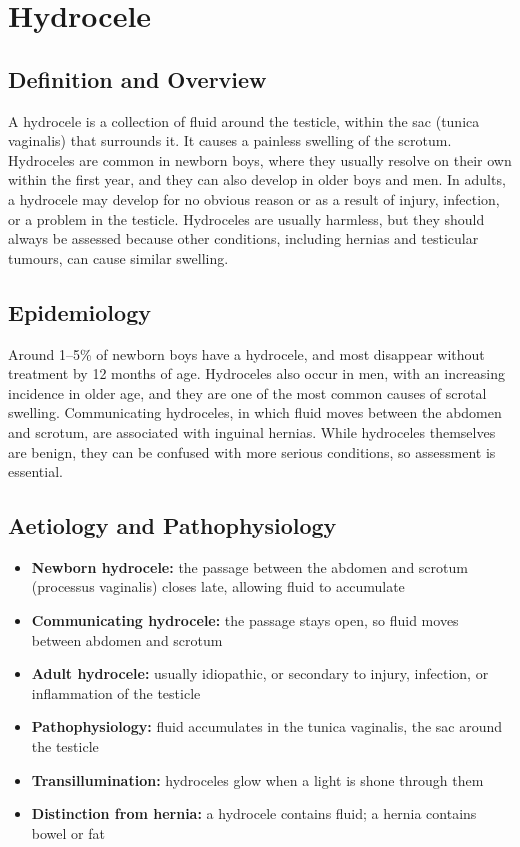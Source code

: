 \chapter{Hydrocele}

\section*{Definition and Overview}
A hydrocele is a collection of fluid around the testicle, within the sac (tunica vaginalis) that surrounds it. It causes a painless swelling of the scrotum. Hydroceles are common in newborn boys, where they usually resolve on their own within the first year, and they can also develop in older boys and men. In adults, a hydrocele may develop for no obvious reason or as a result of injury, infection, or a problem in the testicle. Hydroceles are usually harmless, but they should always be assessed because other conditions, including hernias and testicular tumours, can cause similar swelling.

\section*{Epidemiology}
Around 1--5\% of newborn boys have a hydrocele, and most disappear without treatment by 12 months of age. Hydroceles also occur in men, with an increasing incidence in older age, and they are one of the most common causes of scrotal swelling. Communicating hydroceles, in which fluid moves between the abdomen and scrotum, are associated with inguinal hernias. While hydroceles themselves are benign, they can be confused with more serious conditions, so assessment is essential.

\section*{Aetiology and Pathophysiology}
\begin{itemize}
    \item \textbf{Newborn hydrocele:} the passage between the abdomen and scrotum (processus vaginalis) closes late, allowing fluid to accumulate
    \item \textbf{Communicating hydrocele:} the passage stays open, so fluid moves between abdomen and scrotum
    \item \textbf{Adult hydrocele:} usually idiopathic, or secondary to injury, infection, or inflammation of the testicle
    \item \textbf{Pathophysiology:} fluid accumulates in the tunica vaginalis, the sac around the testicle
    \item \textbf{Transillumination:} hydroceles glow when a light is shone through them
    \item \textbf{Distinction from hernia:} a hydrocele contains fluid; a hernia contains bowel or fat
\end{itemize}

